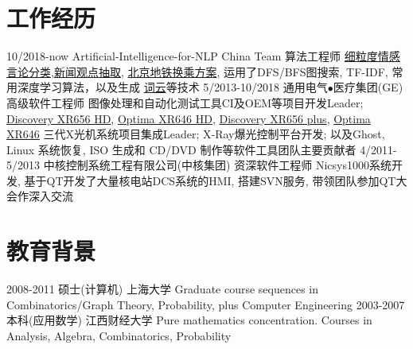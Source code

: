 \documentclass[letterpaper,10pt]{Resume_Liang}
\begin{document}
\begin{body}
\section{工作经历}
\begin{entrylist}
  \entry
    {10/2018-now}
    {Artificial-Intelligence-for-NLP China Team}
    {算法工程师}
    {\href{https://github.com/Artificial-Intelligence-for-NLP-and-CV/comment-setimental-classification}{细粒度情感言论分类},\href{https://github.com/wangliangster/TestWL/blob/master/ViewPointExtract.ipynb}{新闻观点抽取}, \href{https://github.com/wangliangster/NLP-Course/blob/master/BeijingSubway.ipynb}{北京地铁换乘方案}, 运用了DFS/BFS图搜索, TF-IDF, 常用深度学习算法，以及生成 \href{https://github.com/wangliangster/TestWL/blob/master/wordcloudLiang.ipynb}{词云}等技术 }	
  \entry
    {5/2013-10/2018}
    {通用电气$\bullet$医疗集团(GE)}
    {高级软件工程师}
    {图像处理和自动化测试工具CI及OEM等项目开发Leader; \href{https://www.gehealthcare.com/en/products/radiography/fixed-rad-systems/discovery-xr656-hd-x-ray-system-powered-by-helix}{Discovery XR656 HD}, \href{https://www.gehealthcare.com/en/products/radiography/fixed-rad-systems/optima-xr646-hd-x-ray-system-powered-by-helix}{Optima XR646 HD}, \href{https://www.gehealthcare.com/en/products/radiography/fixed-rad-systems/discovery-xr656-plus}{Discovery XR656 plus}, \href{https://www.gehealthcare.com/en/products/radiography/fixed-rad-systems/optima-xr646}{Optima XR646} 三代X光机系统项目集成Leader; X-Ray爆光控制平台开发; 以及Ghost, Linux 系统恢复, ISO 生成和 CD/DVD 制作等软件工具团队主要贡献者}
  \entry
    {4/2011-5/2013}
    {中核控制系统工程有限公司(中核集团)}
    {资深软件工程师}
    {Nicsys1000系统开发, 基于QT开发了大量核电站DCS系统的HMI, 搭建SVN服务, 带领团队参加QT大会作深入交流}
\end{entrylist}


\section{教育背景}
\begin{entrylist}
  \entry
    {2008-2011}
    {硕士(计算机)}
    {上海大学}
    {Graduate course sequences in Combinatorics/Graph Theory, Probability, plus Computer Engineering }
  \entry
    {2003-2007}
    {本科(应用数学)}
    {江西财经大学}
    {Pure mathematics concentration. Courses in Analysis, Algebra, Combinatorics, Probability}
\end{entrylist}



\end{body}
\end{document}
